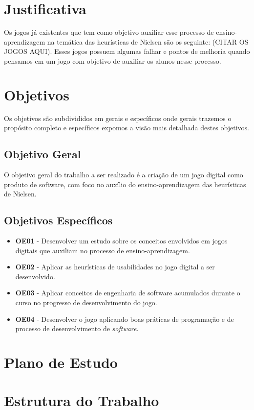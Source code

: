 \section{Justificativa}

Os jogos já existentes que tem como objetivo auxiliar esse processo de ensino-aprendizagem na temática das heurísticas de Nielsen são os seguinte: (CITAR OS JOGOS AQUI). Esses jogos possuem algumas falhar e pontos de melhoria quando pensamos em um jogo com objetivo de auxiliar os alunos nesse processo.

\section{Objetivos}

Os objetivos são subdivididos em gerais e específicos onde gerais trazemos o propósito completo e específicos expomos a visão mais detalhada destes objetivos.

\subsection{Objetivo Geral}

O objetivo geral do trabalho a ser realizado é a criação de um jogo digital como produto de software, com foco no auxílio do ensino-aprendizagem das heurísticas de Nielsen.

\subsection{Objetivos Específicos}
\begin{itemize}
\item \textbf{OE01} - Desenvolver um estudo sobre os conceitos envolvidos em jogos digitais que auxiliam no processo de ensino-aprendizagem.
\item \textbf{OE02} - Aplicar as heurísticas de usabilidades no jogo digital a ser desenvolvido.
\item \textbf{OE03} - Aplicar conceitos de engenharia de software acumulados durante o curso no progresso de desenvolvimento do jogo.
\item \textbf{OE04} - Desenvolver o jogo aplicando boas práticas de programação e de processo de desenvolvimento de \textit{software}.
\end{itemize}

\section{Plano de Estudo}



\section{Estrutura do Trabalho}

